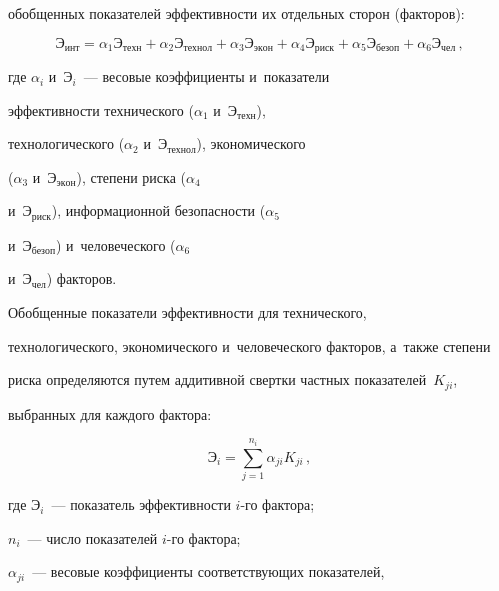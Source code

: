 обобщенных показателей эффективности их отдельных сторон (факторов):

  \begin{equation}

  \mathrm{Э}_{\mathrm{инт}} = \alpha_1\mathrm{Э}_{\mathrm{техн}} + 

  \alpha_2\mathrm{Э}_{\mathrm{технол}} + 

\alpha_3\mathrm{Э}_{\mathrm{экон}} + \alpha_4\mathrm{Э}_{\mathrm{риск}} + 

\alpha_5\mathrm{Э}_{\mathrm{безоп}} + 

\alpha_6\mathrm{Э}_{\mathrm{чел}}\,,

  \label{e1-z}

  \end{equation}

  где $\alpha_i$ и~$\mathrm{Э}_i$~--- весовые коэффициенты и~показатели 

эффективности технического ($\alpha_1$ и~$\mathrm{Э_{техн}}$), 

технологического ($\alpha_2$ и~$\mathrm{Э_{технол}}$), экономического 

($\alpha_3$ и~$\mathrm{Э_{экон}}$), степени риска ($\alpha_4$ 

и~$\mathrm{Э_{риск}}$), информационной безопасности ($\alpha_5$ 

и~$\mathrm{Э_{безоп}}$) и~человеческого ($\alpha_6$ 

и~$\mathrm{Э}_{\mathrm{чел}}$) факторов.

  

  Обобщенные показатели эффективности для технического, 

технологического, экономического и~человеческого факторов, а~также степени 

риска определяются путем аддитивной свертки частных показателей~$K_{ji}$, 

выбранных для каждого фактора: 

  \begin{equation}

  \mathrm{Э}_i=\sum\limits^{n_i}_{j=1} \alpha_{ji} K_{ji}\,,

  \label{e2-z}

  \end{equation}

где $\mathrm{Э}_i$~--- показатель эффективности $i$-го фактора;

$n_i$~--- число показателей $i$-го фактора;

$\alpha_{ji}$~--- весовые коэффициенты соответствующих показателей, 

